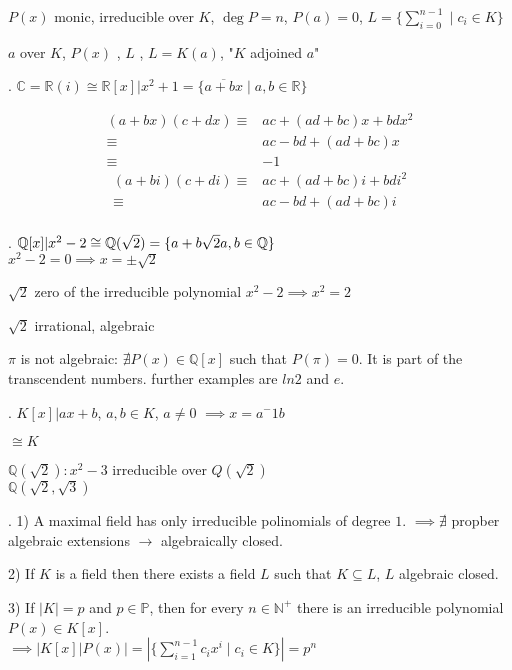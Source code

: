 \begin{definition}
  $P(x)$ monic, irreducible over $K$, $\deg P = n$, $P(a) = 0$, 
  $L = \{ \sum_{i=0}^{n-1} \mid c_i \in K \}$

  $a$  over $K$, $P(x)$ , $L$ , $L = K(a)$, "$K$ adjoined $a$"
\end{definition}

\Example.
$\mathbb{C} = \mathbb{R}(i) \cong \mathbb{R}[x] | x^2 +1 = \{\overline{a+bx} \mid a,b \in \mathbb{R} \}$

\begin{align*}
  (a + bx)(c+dx) 
  \equiv & ac + (ad+bc)x + bd x^2 \\
  \equiv & ac - bd + (ad+bc)x \\
  \equiv & -1
\end{align*}
\begin{align*}
  (a + bi)(c+di) 
  \equiv & ac + (ad+bc)i + bd i^2 \\
  \equiv & ac - bd + (ad+bc)i \\
\end{align*}

\Example.
$\mathbb{Q}[x] | x^2 -2 \cong \mathbb{Q}(\sqrt{2}) = \{ a+b \sqrt{2} \mit a,b \in \mathbb{Q}\}$ \\
$x^2-2 = 0 \implies x = \pm \sqrt{2}$

$\sqrt{2}$ zero of the irreducible polynomial $x^2 -2 \implies x^2 = 2$

$\sqrt{2}$ irrational, algebraic

$\pi$ is not algebraic: $\nexists P(x) \in \mathbb{Q}[x]$ such that $P(\pi) = 0$. It is part of the transcendent numbers. further examples are $ln 2$ and $e$. 

\Example.
$K[x]|ax+b$, $a,b \in K$, $ a\neq 0$ $\implies x = a^-1b$

$\cong K$

$\mathbb{Q}(\sqrt{2}): x^2 -3$ irreducible over $Q(\sqrt{2})$\\
$\mathbb{Q}(\sqrt{2}, \sqrt{3})$

\Remark.
1) A maximal field has only irreducible polinomials of degree $1$. $\implies \nexists$ propber algebraic extensions $\rightarrow$ algebraically closed. 

2) If $K$ is a field then there exists a field $L$ such that $K \subseteq L$, $L$ algebraic closed. 

3) If $|K| = p$ and $p\in \mathbb{P}$, then for every $n \in \mathbb{N}^{+}$ there is an irreducible polynomial $P(x) \in K[x]$. \\
$\implies \left| K[x]|P(x) \right| = \left| \{\sum_{i=1}^{n-1} c_i x^i \mid c_i \in K\} \right| = p^n$

